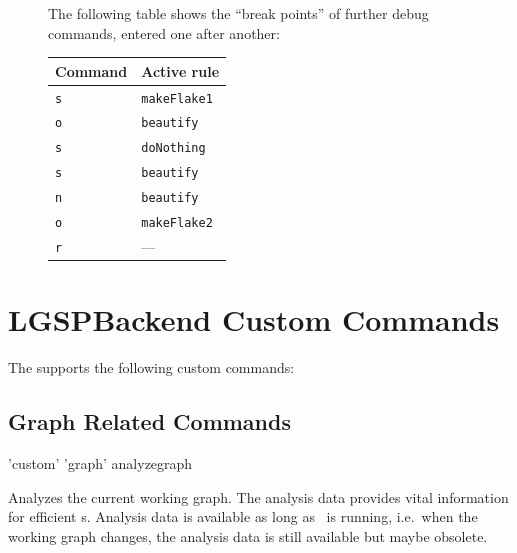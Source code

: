 \begin{figure}[htbp]
\begin{example}
\begin{center}
\end{center}
The following table shows the ``break points'' of further debug commands, entered one after another:
\begin{center}
  \begin{tabular}{|l|l|} \hline
    \textbf{Command} & \textbf{Active rule} \\ \hline
    \texttt{s} & \texttt{makeFlake1} \\
    \texttt{o} & \texttt{beautify} \\
    \texttt{s} & \texttt{doNothing} \\
    \texttt{s} & \texttt{beautify} \\ 
    \texttt{n} & \texttt{beautify} \\ 
    \texttt{o} & \texttt{makeFlake2} \\
    \texttt{r} & --- \\ \hline
  \end{tabular}
\end{center}
\end{example}   
\end{figure}


\section{LGSPBackend Custom Commands}
\label{custom}
The  supports the following custom commands:

\subsection{Graph Related Commands}
\begin{rail}
  'custom' 'graph' analyzegraph
\end{rail}
Analyzes the current working graph. The analysis data provides vital information for efficient s. Analysis data is available as long as \GrShell\ is running, i.e.\ when the working graph changes, the analysis data is still available but maybe obsolete.

